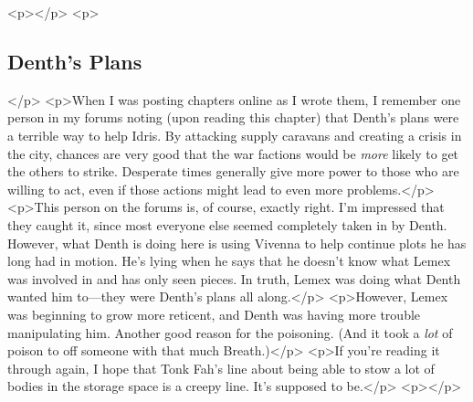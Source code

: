 <p></p>
<p>\subsection*{Denth’s Plans}</p>
<p>When I was posting chapters online as I wrote them, I remember one person in my forums noting (upon reading this chapter) that Denth’s plans were a terrible way to help Idris. By attacking supply caravans and creating a crisis in the city, chances are very good that the war factions would be \textit{more} likely to get the others to strike. Desperate times generally give more power to those who are willing to act, even if those actions might lead to even more problems.</p>
<p>This person on the forums is, of course, exactly right. I’m impressed that they caught it, since most everyone else seemed completely taken in by Denth. However, what Denth is doing here is using Vivenna to help continue plots he has long had in motion. He’s lying when he says that he doesn’t know what Lemex was involved in and has only seen pieces. In truth, Lemex was doing what Denth wanted him to—they were Denth’s plans all along.</p>
<p>However, Lemex was beginning to grow more reticent, and Denth was having more trouble manipulating him. Another good reason for the poisoning. (And it took a \textit{lot} of poison to off someone with that much Breath.)</p>
<p>If you’re reading it through again, I hope that Tonk Fah’s line about being able to stow a lot of bodies in the storage space is a creepy line. It’s supposed to be.</p>
<p></p>



